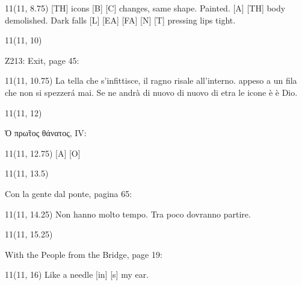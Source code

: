 \documentclass[11pt]{article}
\begin{document}
\begin{textblock}{11}(11, 8.75)
\color{black}
[TH] icons [B] [C] changes, same shape. Painted. [A] [TH] body demolished. Dark falls [L] [EA] [FA] [N] [T] pressing lips tight.
\rightskip\leftskip
\end{textblock}

\begin{textblock}{11}(11, 10)
\begin{center}
\color{mypink}
Z213: Exit, page 45:
\end{center}
\end{textblock}

\begin{textblock}{11}(11, 10.75)
\color{black}
La tella che s'infittisce, il ragno risale all'interno. appeso a un fila che non si spezzerá mai. Se ne andrà di nuovo di nuovo di etra le icone è è Dio.
\rightskip\leftskip
\end{textblock}

\begin{textblock}{11}(11, 12)
\begin{center}
\color{mypink}
Ὁ πρ\~ωτος θάνατος, IV:
\end{center}
\end{textblock}

\begin{textblock}{11}(11, 12.75)
\color{black}
[A] [O]
\rightskip\leftskip
\end{textblock}

\begin{textblock}{11}(11, 13.5)
\begin{center}
\color{mypink}
Con la gente dal ponte, pagina 65:
\end{center}
\end{textblock}

\begin{textblock}{11}(11, 14.25)
\color{black}
Non hanno molto tempo. Tra poco dovranno partire.
\rightskip\leftskip
\end{textblock}

\begin{textblock}{11}(11, 15.25)
\begin{center}
\color{mypink}
With the People from the Bridge, page 19:
\end{center}
\end{textblock}

\begin{textblock}{11}(11, 16)
\color{black}
Like a needle [in] [s] my ear.
\rightskip\leftskip
\end{textblock}
\end{document}
